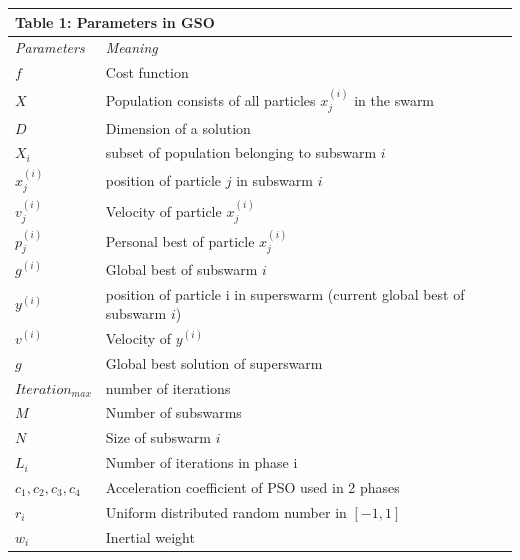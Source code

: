\documentclass[a4paper]{article}
\begin{document}
\begin{tabular}{ |p{3cm}||p{9cm}| }
 \hline
 \multicolumn{2}{|l|}{\textbf{Table 1:} Parameters in GSO}  \\
 \hline
 \textit{Parameters}& \textit{Meaning}\\
 \hline
 $f$   & Cost function   \\
 $X$   & Population consists of all particles $x_j^{(i)}$ in the swarm \\
 $D$   & Dimension of a solution \\
 $X_i$ & subset of population belonging to subswarm $i$ \\
 $x_j^{(i)}$  & position of particle $j$ in subswarm $i$ \\
 $v_j^{(i)}$  & Velocity of particle $x_j^{(i)}$ \\
 $p_j^{(i)}$  & Personal best of particle $x_j^{(i)}$ \\
 $g^{(i)}$  & Global best of subswarm $i$ \\
 $y^{(i)}$  & position of particle i in superswarm (current global best of subswarm $i$) \\
 $v^{(i)}$  & Velocity of $y^{(i)}$ \\
 $g$  & Global best solution of superswarm \\
 $Iteration_{max}$  & number of iterations \\
 $M$  & Number of subswarms \\
 $N$  & Size of subswarm $i$ \\
 $L_i$  & Number of iterations in phase i \\
 $c_1, c_2, c_3, c_4$  & Acceleration coefficient of PSO used in 2 phases \\
 $r_i$  & Uniform distributed random number in $[-1, 1]$ \\
 $w_i$  & Inertial weight \\
 
 \hline
\end{tabular}
\\ \\
\end{document}
